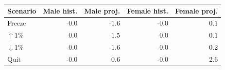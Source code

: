 \begingroup
\renewcommand{\arraystretch}{1.08}
\setlength{\tabcolsep}{4pt}
\begin{tabular}{lrrrr}
\toprule
Scenario & Male hist. & Male proj. & Female hist. & Female proj. \\
\midrule
Freeze & -0.0 & -1.6 & -0.0 & 0.1 \\
$\uparrow$1\% & -0.0 & -1.5 & -0.0 & 0.1 \\
$\downarrow$1\% & -0.0 & -1.6 & -0.0 & 0.2 \\
Quit & -0.0 & 0.6 & -0.0 & 2.6 \\
\bottomrule
\end{tabular}
\endgroup
